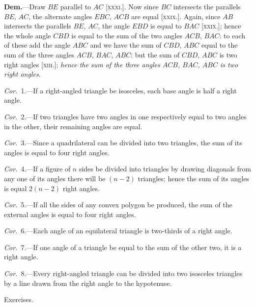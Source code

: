 \documentclass[oneside]{book}
\newcommand\exhead[1]{
\Needspace*{5\baselineskip}\begin{center}
\textsf{#1}
\end{center}
}
\begin{document}
\textbf{Dem.}---Draw $BE$ parallel to $AC$ [\textsc{xxxi}.]. Now since
$BC$ intersects the parallels $BE$,
$AC$, the alternate angles $EBC$,
$ACB$ are equal [\textsc{xxix}.]. Again,
since $AB$ intersects the parallels
$BE$, $AC$, the angle $EBD$ is
equal to $BAC$ [\textsc{xxix}.]; hence
the whole angle $CBD$ is equal
to the sum of the two angles
$ACB$, $BAC$: to each of these add the angle $ABC$ and
we have the sum of $CBD$, $ABC$ equal to the sum of the
three angles $ACB$, $BAC$, $ABC$: but the sum of $CBD$,
$ABC$ is two right angles [\textsc{xiii}.]; \emph{hence the sum of the
three angles $ACB$, $BAC$, $ABC$ is two right angles}.

\emph{Cor.}~1.---If a right-angled triangle be isosceles, each
base angle is half a right angle.

\emph{Cor.}~2.---If two triangles have two angles in one
respectively equal to two angles in the other, their
remaining angles are equal.

\emph{Cor.}~3.---Since a quadrilateral can be divided into
two triangles, the sum of its angles is equal to four
right angles.

\emph{Cor.}~4.---If a figure of $n$ sides be divided into triangles
by drawing diagonals from any one of its angles
there will be $(n-2)$ triangles; hence the sum of its
angles is equal $2(n-2)$ right angles.

\emph{Cor.}~5.---If all the sides of any convex polygon be
produced, the sum of the external angles is equal to
four right angles.

\emph{Cor.}~6.---Each angle of an equilateral triangle is
two-thirds of a right angle.

\emph{Cor.}~7.---If one angle of a triangle be equal to the
sum of the other two, it is a right angle.

\emph{Cor.}~8.---Every right-angled triangle can be divided
into two isosceles triangles by a line drawn from the
right angle to the hypotenuse.


\exhead{Exercises.}
\end{document}
